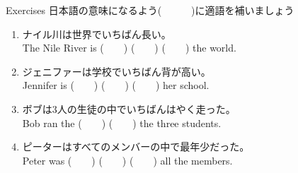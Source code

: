 \documentclass[aspectratio=169,xcolor={dvipsnames,table}]{beamer}
\begin{document}
 \begin{frame}[plain]{Exercises}
日本語の意味になるよう(~~~~~~)に適語を補いましょう
  \begin{enumerate}
   \item ナイル川は世界でいちばん長い。\\
	 The Nile River is (~~~~) (~~~~) (~~~~) the world.
   \item ジェニファーは学校でいちばん背が高い。\\
	 Jennifer is (~~~~) (~~~~) (~~~~) her school.
   \item ボブは3人の生徒の中でいちばんはやく走った。\\
	 Bob ran the (~~~~) (~~~~) the three students.
   \item ピーターはすべてのメンバーの中で最年少だった。\\
	 Peter was  (~~~~) (~~~~) (~~~~) all the members.
  \end{enumerate}
 \end{frame}
\end{document}
